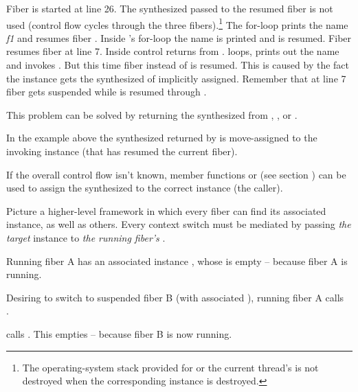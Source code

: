 Fiber  is started at line 26. The synthesized \fiber\xspace {} passed 
to the resumed fiber is not used (control flow cycles through the three
fibers).\footnote{The operating-system stack provided for \main or the current
thread's \entryfn is not destroyed when the corresponding \fiber instance is
destroyed.}
The for-loop prints the name \emph{f1} and resumes fiber . Inside 
's for-loop the name is printed and  is resumed. Fiber 
resumes fiber  at line 7. Inside  control returns from
.  loops, prints out the name and invokes . But
this time fiber  instead of  is resumed. This is caused by the
fact the instance  gets the synthesized \fiber of  implicitly
assigned. Remember that at line 7 fiber  gets suspended while 
is resumed through .

This problem can be solved by returning the synthesized \fiber from \resume,
\resumewith, \xtresume or \xtresumewith.

In the example above the synthesized \fiber returned by \resume is
move-assigned to the invoking \fiber instance (that has resumed the current
fiber).

\xspace\newline

If the overall control flow isn't known, member functions \resumewith
or \xtresumewith (see section ) can be used to assign the
synthesized \fiber to the correct \fiber instance (the caller).

Picture a higher-level framework in which every fiber can find its associated
 instance, as well as others. Every context switch must be mediated by
passing \emph{the target}  instance to \emph{the running fiber's}
.

Running fiber A has an associated  instance ,
whose \fiber {} is empty -- because fiber A is running.

Desiring to switch to suspended fiber B (with associated
 ), running fiber A calls\\
.

 calls .
This empties  -- because fiber B is now running.

